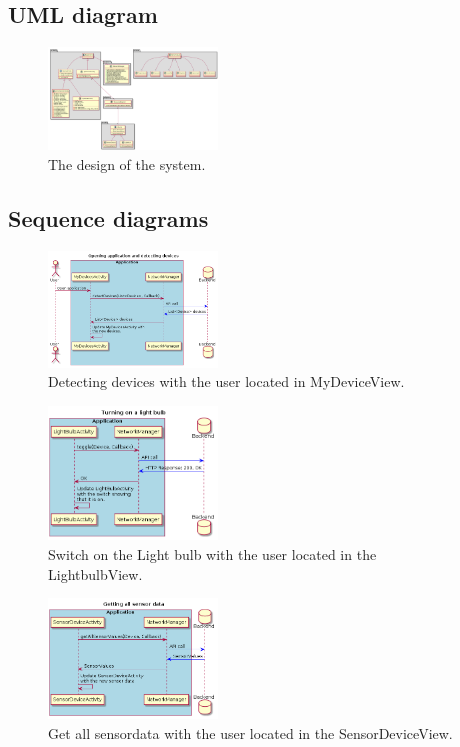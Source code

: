 \documentclass[a4paper]{article}
\begin{document}
\subsection{UML diagram}
	\begin{figure}[H]
    \centering
    \includegraphics[width=0.4\textwidth]{class_diagram.png}
    \caption{The design of the system.}
    \label{fig:seq}
\end{figure}

	
	\subsection{Sequence diagrams}
	
	\begin{figure}[H]
    \centering
    \includegraphics[width=0.4\textwidth]{seq.png}
    \caption{Detecting devices with the user located in MyDeviceView.}
    \label{fig:seq}
\end{figure}

\begin{figure}[H]
    \centering
    \includegraphics[width=0.4\textwidth]{seq1.png}
    \caption{Switch on the Light bulb with the user located in the LightbulbView.}
    \label{fig:seq1}
\end{figure}

\begin{figure}[H]
    \centering
    \includegraphics[width=0.4\textwidth]{seq2.png}
    \caption{Get all sensordata with the user located in the SensorDeviceView.}
    \label{fig:seq2}
\end{figure}
\end{document}
